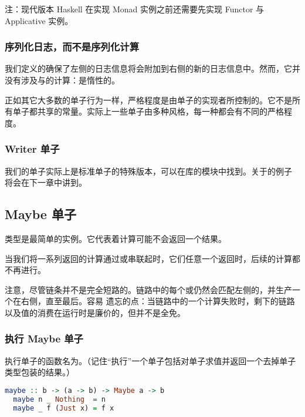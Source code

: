 \documentclass[./main.tex]{subfiles}
\begin{document}
注：现代版本 Haskell 在实现 Monad 实例之前还需要先实现 Functor 与 Applicative 实例。

\subsubsection*{序列化日志，而不是序列化计算}

我们定义的\acode{(>>=)}确保了左侧的日志信息将会附加到右侧的新的日志信息中。然而，它并没有涉及与的计算：\acode{(>>=)}是惰性的。

正如其它大多数的单子行为一样，严格程度是由单子的实现者所控制的。它不是所有单子都共享的常量。实际上一些单子由多种风格，每一种都会有不同的严格程度。

\subsubsection*{Writer 单子}

我们的单子实际上是标准单子的特殊版本，可以在库的模块中找到。关于的例子
将会在下一章中讲到。

\subsection*{Maybe 单子}

类型是最简单的实例。它代表着计算可能不会返回一个结果。

当我们将一系列返回的计算通过\acode{(>>=)}或\acode{>>}串联起时，它们任意一个返回时，后续的计算都不再进行。

注意，尽管链条并不是完全短路的。链路中的每个\acode{(>>=)}或\acode{(>>)}仍然会匹配左侧的，并生产一个在右侧，直至最后。容易
遗忘的点：当链路中的一个计算失败时，剩下的链路以及值的消费在运行时是廉价的，但并不是全免。

\subsubsection*{执行 Maybe 单子}

执行单子的函数名为。（记住“执行”一个单子包括对单子求值并返回一个去掉单子类型包装的结果。）

\begin{lstlisting}[language=Haskell]
  maybe :: b -> (a -> b) -> Maybe a -> b
  maybe n _ Nothing  = n
  maybe _ f (Just x) = f x
\end{lstlisting}
\end{document}
